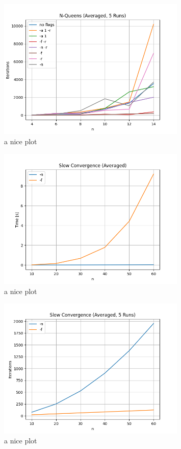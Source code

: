\begin{figure}[ht]
	\centering
	\includegraphics[width=0.8\textwidth]{./Problems/queens/plots/iterations.png}
	\caption{a nice plot}
	\label{fig:queens:iterations}
\end{figure}



\begin{figure}[ht]
	\centering
	\includegraphics[width=0.8\textwidth]{./Problems/slow_convergence/plots/time.png}
	\caption{a nice plot}
	\label{fig:slow:time}
\end{figure}

\begin{figure}[ht]
	\centering
	\includegraphics[width=0.8\textwidth]{./Problems/slow_convergence/plots/iterations.png}
	\caption{a nice plot}
	\label{fig:slow:iterations}
\end{figure}


